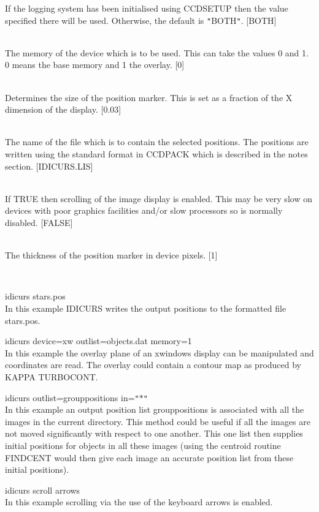 \documentclass[twoside,11pt]{article}
\newcommand{\htmlref}[2]{#1}
\newcommand{\xref}[3]{#1}
\renewcommand{\_}{\texttt{\symbol{95}}}
\newcommand{\qt}[1]{{\tt "}#1{\tt "}}
\newcommand{\routine}[1]{{\sc #1}}
\newcommand{\xroutine}[1]{\htmlref{{\sc #1}}{#1}}
\newcommand{\sstexamples}[1]{
   \item[Examples:] \mbox{} \\
   \vspace{-3.5ex}
   \begin{description}
      #1
   \end{description}
}
\newcommand{\sstsubsection}[1]{ \item[{#1}] \mbox{} \\}
\newcommand{\sstexamplesubsection}[2]{\sloppy \item{\ssttt #1} \mbox{} \\ #2 }
\newcommand{\sstnotes}[1]{\item[Notes:] \mbox{} \\[1.3ex] #1}
\newcommand{\sstitemlist}[1]{
  \mbox{} \\
  \vspace{-3.5ex}
  \begin{itemize}
     #1
  \end{itemize}
}
\newcommand{\sstexamples}[1]{
      \item[Examples:] \\
      \begin{description}
         #1
      \end{description}
      \\
   }
\newcommand{\sstsubsection}[1]{\item[{#1}]}
\newcommand{\sstexamplesubsection}[2]{\item[{\ssttt #1}] #2}
\newcommand{\sstnotes}[1]{\item[Notes:] #1 }
\newcommand{\sstitemlist}[1]{
      \begin{itemize}
         #1
      \end{itemize}
      \\
   }
\begin{document}
{{{{         }
         If the logging system has been initialised using \xroutine{CCDSETUP}
         then the value specified there will be used. Otherwise, the
         default is \qt{BOTH}.
         [BOTH]
      }
      \sstsubsection{
         MEMORY = \_INTEGER (Read)
      }{
         The memory of the device which is to be used. This can take
         the values 0 and 1. 0 means the base memory and 1 the overlay.
         [0]
      }
      \sstsubsection{
         MSIZE = \_REAL (Read)
      }{
         Determines the size of the position marker. This is set as a
         fraction of the X dimension of the display.
         [0.03]
      }
      \sstsubsection{
         OUTLIST = FILENAME (Write)
      }{
         The name of the file which is to contain the selected
         positions. The positions are written using the
         standard format in CCDPACK which is described in the notes
         section.
         [IDICURS.LIS]
      }
      \sstsubsection{
         SCROLL = \_LOGICAL (Read)
      }{
         If TRUE then scrolling of the image display is enabled. This
         may be very slow on devices with poor graphics facilities
         and/or slow processors so is normally disabled.
         [FALSE]
      }
      \sstsubsection{
         THICK = \_INTEGER (Read)
      }{
         The thickness of the position marker in device pixels.
         [1]
      }
   }
   \sstexamples{
      \sstexamplesubsection{
         idicurs stars.pos
      }{
         In this example \routine{IDICURS} writes the output positions to the
         formatted file stars.pos.
      }
      \sstexamplesubsection{
         idicurs device=xw outlist=objects.dat memory=1
      }{
         In this example the overlay plane of an xwindows display
         can be manipulated and coordinates are read. The overlay
         could contain a contour map as produced by KAPPA
         \xref{TURBOCONT}{sun95}{TURBOCONT}.
      }
      \sstexamplesubsection{
         idicurs outlist=group\_positions in=\qt{$*$}
      }{
         In this example an output position list group\_positions is
         associated with all the images in the current directory. This
         method could be useful if all the images are not moved
         significantly with respect to one another. This one list then
         supplies initial positions for objects in all these images (using
         the centroid routine \xroutine{FINDCENT} would then give each image an
         accurate position list from these initial positions).
      }
      \sstexamplesubsection{
         idicurs scroll arrows
      }{
         In this example scrolling via the use of the keyboard arrows is
         enabled.
      }
   }
   \sstnotes{
      \sstitemlist{

}}}
\end{document}
